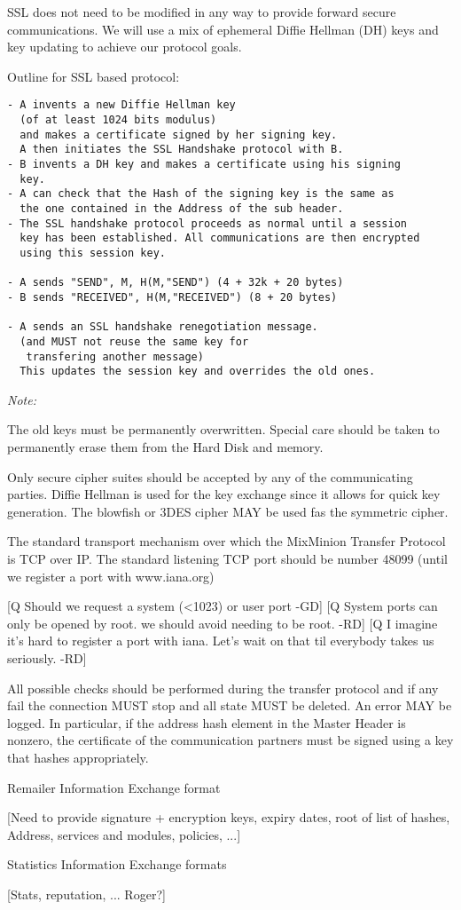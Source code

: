 SSL does not need to be modified in any way to provide forward secure
communications. We will use a mix of ephemeral Diffie Hellman (DH)
keys and key updating to achieve our protocol goals.

Outline for SSL based protocol:

\begin{verbatim}
- A invents a new Diffie Hellman key 
  (of at least 1024 bits modulus)
  and makes a certificate signed by her signing key.
  A then initiates the SSL Handshake protocol with B.
- B invents a DH key and makes a certificate using his signing
  key.
- A can check that the Hash of the signing key is the same as
  the one contained in the Address of the sub header.
- The SSL handshake protocol proceeds as normal until a session
  key has been established. All communications are then encrypted
  using this session key.

- A sends "SEND", M, H(M,"SEND") (4 + 32k + 20 bytes)
- B sends "RECEIVED", H(M,"RECEIVED") (8 + 20 bytes)

- A sends an SSL handshake renegotiation message.
  (and MUST not reuse the same key for 
   transfering another message)
  This updates the session key and overrides the old ones.
\end{verbatim}

\emph{Note:}

The old keys must be permanently overwritten. Special care should be
taken to permanently erase them from the Hard Disk and memory. 

Only secure cipher suites should be accepted by any of the
communicating parties. Diffie Hellman is used for the key exchange
since it allows for quick key generation. The blowfish or 3DES cipher
MAY be used fas the symmetric cipher.

The standard transport mechanism over which the MixMinion Transfer
Protocol is TCP over IP. The standard listening TCP port should be 
number 48099 (until we register a port with www.iana.org)

[Q Should we request a system (<1023) or user port -GD]
[Q System ports can only be opened by root. we should avoid needing
to be root. -RD]
[Q I imagine it's hard to register a port with iana. Let's wait on
that til everybody takes us seriously. -RD]

All possible checks should be performed during the transfer protocol
and if any fail the connection MUST stop and all state MUST
be deleted. An error MAY be logged. In particular, if the address
hash element in the Master Header is nonzero, the certificate of
the communication partners must be signed using a key that hashes
appropriately.

Remailer Information Exchange format

[Need to provide signature + encryption keys, expiry dates, root of
list of hashes, Address, services and modules, policies, ...]

Statistics Information Exchange formats

[Stats, reputation, ... Roger?]
